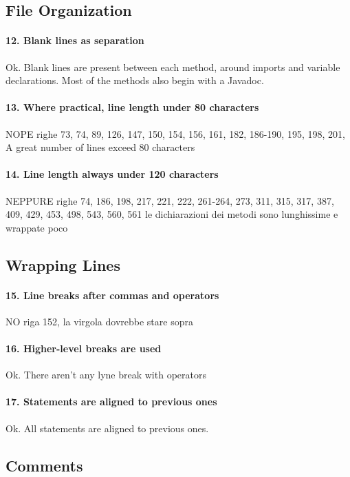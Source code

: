 \documentclass[english]{article}
\begin{document}
\subsection{File Organization}
\paragraph{12. Blank lines as separation}
Ok.
Blank lines are present between each method, around imports and variable declarations.
Most of the methods also begin with a Javadoc.

\paragraph{13. Where practical, line length under 80 characters}
NOPE
righe 73, 74, 89, 126, 147, 150, 154, 156, 161, 182, 186-190, 195, 198, 201, 
A great number of lines exceed 80 characters

\paragraph{14. Line length always under 120 characters}
NEPPURE
righe 74, 186, 198, 217, 221, 222, 261-264, 273, 311, 315, 317, 387, 409, 429, 453, 498, 543, 560, 561
le dichiarazioni dei metodi sono lunghissime e wrappate poco

\subsection{Wrapping Lines}
\paragraph{15. Line breaks after commas and operators}
NO
riga 152, la virgola dovrebbe stare sopra %

\paragraph{16. Higher-level breaks are used}
 Ok. There aren't any lyne break with operators

\paragraph{17. Statements are aligned to previous ones}
Ok. All statements are aligned to previous ones.

\subsection{Comments}
\end{document}
